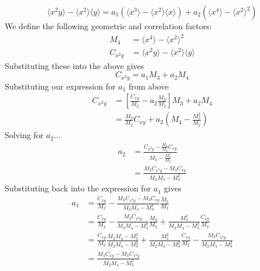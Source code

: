 \documentclass[oneside]{tufte-handout}
\begin{document}
\begin{fullwidth}
\begin{equation}
\langle x^2 y \rangle - \langle x^2 \rangle \langle y \rangle = a_1 (\langle x^3 \rangle - \langle x^2 \rangle \langle x \rangle) + a_2 (\langle x^4 \rangle - \langle x^2 \rangle^2)
\end{equation}
We define the following geometric and correlation factors:
\begin{align*}
M_4 &= \langle x^4 \rangle - \langle x^2 \rangle^2 \\
C_{x^2y} &= \langle x^2 y \rangle - \langle x^2 \rangle \langle y \rangle
\end{align*}
Substituting these into the above gives
\begin{equation*}
C_{x^2y} = a_1 M_3 + a_2 M_4
\end{equation*}
Substituting our expression for $a_1$ from above
\begin{align*}
C_{x^2y} &= \left[
     \frac{C_{xy}}{M_2} - a_2 \frac{M_3}{M_2}
     \right] M_3 + a_2 M_4 \\
     &= \frac{M_3}{M_2} C_{xy} + a_2 (M_4 - \frac{M_3^2}{M_2})
\end{align*}
Solving for $a_2$...
\begin{align*}
a_2 &= \frac{
        C_{x^2y} - \frac{M_3}{M_2} C_{xy}
     }{
        M_4 - \frac{M_3^2}{M_2}
     } \\
     &= \frac{
        M_2 C_{x^2y} - M_3 C_{xy}
     }{
        M_2 M_4 - M_3^2
     }
\end{align*}
Substituting back into the expression for $a_1$ gives
\begin{align*}
a_1 &= \frac{C_{xy}}{M_2} - \frac{
        M_2 C_{x^2y} - M_3 C_{xy}
     }{
        M_2 M_4 - M_3^2
     } \frac{M_3}{M_2} \\
     &= \frac{C_{xy}}{M_2} 
         - \frac{M_2 C_{x^2y}}{M_2 M_4 - M_3^2} \frac{M_3}{M_2} 
         + \frac{M_3^2 }{M_2 M_4 - M_3^2} \frac{C_{xy}}{M_2} \\
     &= \frac{C_{xy}}{M_2} \frac{M_2 M_4 - M_3^2}{M_2 M_4 - M_3^2}
         + \frac{M_3^2 }{M_2 M_4 - M_3^2} \frac{C_{xy}}{M_2} 
         - \frac{M_3 C_{x^2y}}{M_2 M_4 - M_3^2} \\
     &=  \frac{M_4 C_{xy} - M_3 C_{x^2y}}{M_2 M_4 - M_3^2}
\end{align*}


\end{fullwidth}
\end{document}
